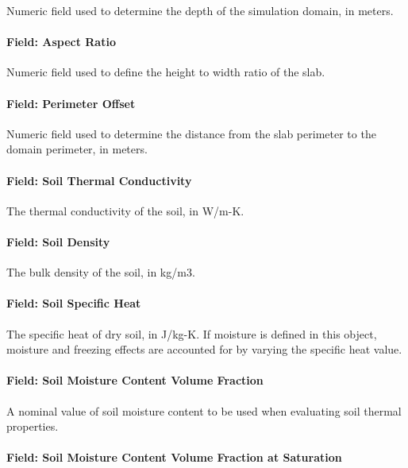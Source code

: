 Numeric field used to determine the depth of the simulation domain, in meters.

\paragraph{Field: Aspect Ratio}\label{field-aspect-ratio}

Numeric field used to define the height to width ratio of the slab.

\paragraph{Field: Perimeter Offset}\label{field-perimeter-offset}

Numeric field used to determine the distance from the slab perimeter to the domain perimeter, in meters.

\paragraph{Field: Soil Thermal Conductivity}\label{field-soil-thermal-conductivity-3}

The thermal conductivity of the soil, in W/m-K.

\paragraph{Field: Soil Density}\label{field-soil-density-3}

The bulk density of the soil, in kg/m3.

\paragraph{Field: Soil Specific Heat}\label{field-soil-specific-heat-3}

The specific heat of dry soil, in J/kg-K. If moisture is defined in this object, moisture and freezing effects are accounted for by varying the specific heat value.

\paragraph{Field: Soil Moisture Content Volume Fraction}\label{field-soil-moisture-content-volume-fraction-1}

A nominal value of soil moisture content to be used when evaluating soil thermal properties.

\paragraph{Field: Soil Moisture Content Volume Fraction at Saturation}\label{field-soil-moisture-content-volume-fraction-at-saturation-1}

